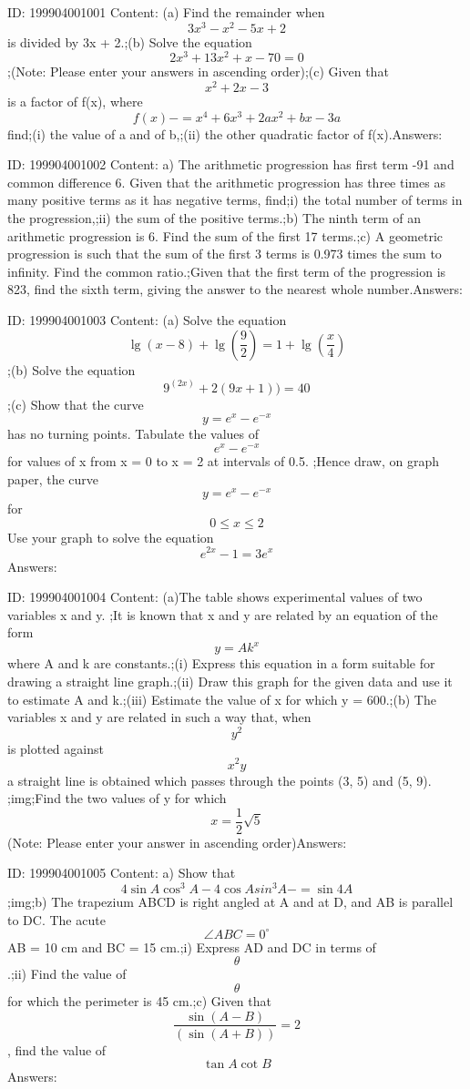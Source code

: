 \documentclass{article}
\begin{document}
ID: 199904001001
Content:
(a) Find the remainder when \[3x^3-x^2-5x+2\] is divided by 3x + 2.;(b) Solve the equation \[2x^3+13x^2+x-70=0\];(Note: Please enter your answers in ascending order);(c) Given that \[x^2+2x-3\] is a factor of f(x), where \[f(x)-=x^4+6x^3+2ax^2+bx-3a\] find;(i)	the value of a and of b,;(ii)	the other quadratic factor of f(x).Answers:

ID: 199904001002
Content:
a) The arithmetic progression has first term -91 and common difference 6. Given that the arithmetic progression has three times as many positive terms as it has negative terms, find;i) the total number of terms in the progression,;ii) the sum of the positive terms.;b) The ninth term of an arithmetic progression is 6. Find the sum of the first 17 terms.;c) A geometric progression is such that the sum of the first 3 terms is 0.973 times the sum to infinity. Find the common ratio.;Given that the first term of the progression is 823, find the sixth term, giving the answer to the nearest whole number.Answers:

ID: 199904001003
Content:
(a)	Solve the equation \[\lg(x-8)+\lg(\frac{9}{2})=1+\lg(\frac{x}{4})\];(b)	Solve the equation \[9^{(2x)}+2(9{x+1}))=40\];(c)	Show that the curve \[y=e^x-e^{-x}\] has no turning points. Tabulate the values of \[e^x-e^{-x}\] for values of x from x = 0 to x = 2 at intervals of 0.5. ;Hence draw, on graph paper, the curve \[y=e^x-e^{-x}\] for \[0\leq x\leq 2\] Use your graph to solve the equation \[e^{2x}-1=3e^x\]Answers:

ID: 199904001004
Content:
(a)The table shows experimental values of two variables x and y. ;It is known that x and y are related by an equation of the form \[y=Ak^x\] where A and k are constants.;(i)	Express this equation in a form suitable for drawing a straight line graph.;(ii)	Draw this graph for the given data and use it to estimate A and k.;(iii) Estimate the value of x for which y = 600.;(b)	The variables x and y are related in such a way that, when \[y^2\] is plotted against \[x^2y\] a straight line is obtained which passes through the points (3, 5) and (5, 9). ;img;Find the two values of y for which \[x=\frac{1}{2}\sqrt5\] (Note: Please enter your answer in ascending order)Answers:

ID: 199904001005
Content:
a) Show that \[4 \sin A\cos^3A-4\cos Asin^3A-=\sin4A\] ;img;b) The trapezium ABCD is right angled at A and at D, and AB is parallel to DC. The acute \[\angle ABC=0^{\circ}\]  AB = 10 cm and BC = 15 cm.;i) Express AD and DC in terms of \[\theta \].;ii) Find the value of \[\theta\] for which the perimeter is 45 cm.;c) Given that \[\frac{\sin(A-B)}{(\sin(A+B))}=2\], find the value of \[\tan A\cot B\]Answers:
\end{document}
